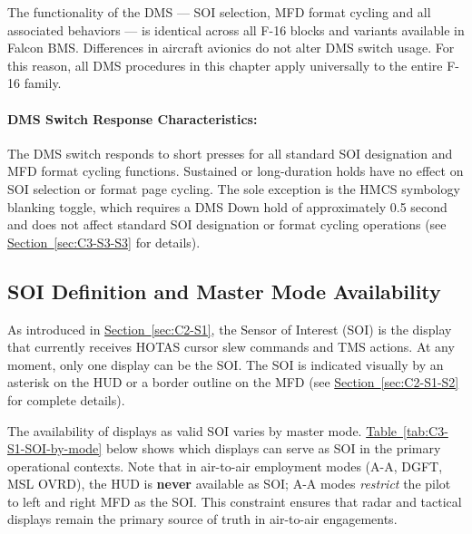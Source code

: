 \documentclass[11pt, a4paper, twoside]{report}
\newcommand{\secref}[1]{\hyperref[#1]{Section~\ref*{#1}}}
\newcommand{\tabref}[1]{\hyperref[#1]{Table~\ref*{#1}}}
\begin{document}
The functionality of the DMS --- SOI selection, MFD format cycling and all associated behaviors --- is identical across all F-16 blocks and variants available in Falcon BMS. Differences in aircraft avionics do not alter DMS switch usage. For this reason, all DMS procedures in this chapter apply universally to the entire F-16 family.

\paragraph*{DMS Switch Response Characteristics:}

The DMS switch responds to short presses for all standard SOI designation and MFD format cycling functions. Sustained or long-duration holds have no effect on SOI selection or format page cycling. The sole exception is the HMCS symbology blanking toggle, which requires a DMS Down hold of approximately 0.5 second and does not affect standard SOI designation or format cycling operations (see \secref{sec:C3-S3-S3} for details).

\subsection{SOI Definition and Master Mode Availability}
\label{sec:C3-S1-S1}

As introduced in \secref{sec:C2-S1}, the Sensor of Interest (SOI) is the display that currently receives HOTAS cursor slew commands and TMS actions. At any moment, only one display can be the SOI. The SOI is indicated visually by an asterisk on the HUD or a border outline on the MFD (see \secref{sec:C2-S1-S2} for complete details).

The availability of displays as valid SOI varies by master mode. \tabref{tab:C3-S1-SOI-by-mode} below shows which displays can serve as SOI in the primary operational contexts. Note that in air-to-air employment modes (A-A, DGFT, MSL OVRD), the HUD is \textbf{never} available as SOI; A-A modes \textit{restrict} the pilot to left and right MFD as the SOI. This constraint ensures that radar and tactical displays remain the primary source of truth in air-to-air engagements.

\small
\renewcommand{\arraystretch}{1.2}
\end{document}

